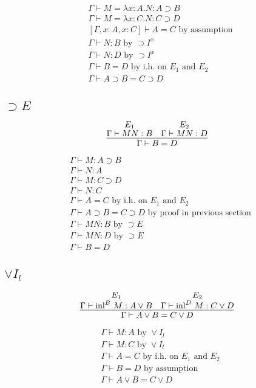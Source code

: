 \documentclass[11pt]{article}
\begin{document}
\begin{align*}
  & \Gamma \vdash M = \lambda x:A. N : A \supset B \\
  & \Gamma \vdash M = \lambda x:C. N : C \supset D \\
  & [\Gamma, x:A, x:C] \vdash A = C \text { by assumption} \\
  & \Gamma \vdash N: B \text { by } \supset I^x \\
  & \Gamma \vdash N: D \text { by } \supset I^x \\
  & \Gamma \vdash B = D \text { by i.h. on $E_1$ and $E_2$} \\
  & \Gamma \vdash A \supset B = C \supset D
\end{align*}


\subsection{$\supset E$}

\[
\infer
  {\Gamma \vdash B = D}
  {
    \deduce{\Gamma \vdash M N: B}{E_1} &
    \deduce{\Gamma \vdash M N: D}{E_2}
  }
\]


\begin{align*}
  & \Gamma \vdash M : A \supset B \\
  & \Gamma \vdash N : A  \\
  & \Gamma \vdash M : C \supset D \\
  & \Gamma \vdash N : C \\
  & \Gamma \vdash A = C \text{ by i.h. on $E_1$ and $E_2$} \\
  & \Gamma \vdash A \supset B = C \supset D \text{ by proof in previous section} \\
  & \Gamma \vdash M N : B \text{ by } \supset E \\
  & \Gamma \vdash M N : D \text{ by } \supset E \\
  & \Gamma \vdash B = D
\end{align*}


\subsection{$\vee I_l$}
\[
\infer
  {\Gamma \vdash A \vee B = C \vee D}
  {
    \deduce{\Gamma \vdash \text{inl}^B~M: A \vee B}{E_1} &
    \deduce{\Gamma \vdash \text{inl}^D~M: C \vee D}{E_2}
  }
\]


\begin{align*}
  & \Gamma \vdash M : A \text{ by } \vee I_l \\
  & \Gamma \vdash M : C \text{ by } \vee I_l \\
  & \Gamma \vdash A = C \text{ by i.h. on $E_1$ and $E_2$} \\
  & \Gamma \vdash B = D \text{ by assumption} \\
  & \Gamma \vdash A \vee B = C \vee D
\end{align*}
\end{document}
